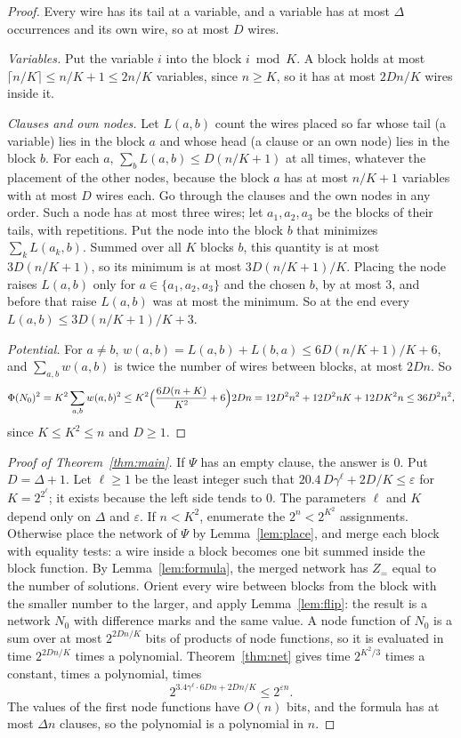 \documentclass[11pt]{article}
\begin{document}
\begin{proof}
Every wire has its tail at a variable, and a variable has at most $\Delta$ occurrences and its own wire, so at most $D$ wires.

\emph{Variables.} Put the variable $i$ into the block $i\bmod K$. A block holds at most $\lceil n/K\rceil\le n/K+1\le2n/K$ variables, since $n\ge K$, so it has at most $2Dn/K$ wires inside it.

\emph{Clauses and own nodes.} Let $L(a,b)$ count the wires placed so far whose tail (a variable) lies in the block $a$ and whose head (a clause or an own node) lies in the block $b$. For each $a$, $\sum_bL(a,b)\le D(n/K+1)$ at all times, whatever the placement of the other nodes, because the block $a$ has at most $n/K+1$ variables with at most $D$ wires each. Go through the clauses and the own nodes in any order. Such a node has at most three wires; let $a_1,a_2,a_3$ be the blocks of their tails, with repetitions. Put the node into the block $b$ that minimizes $\sum_kL(a_k,b)$. Summed over all $K$ blocks $b$, this quantity is at most $3D(n/K+1)$, so its minimum is at most $3D(n/K+1)/K$. Placing the node raises $L(a,b)$ only for $a\in\{a_1,a_2,a_3\}$ and the chosen $b$, by at most $3$, and before that raise $L(a,b)$ was at most the minimum. So at the end every $L(a,b)\le3D(n/K+1)/K+3$.

\emph{Potential.} For $a\ne b$, $w(a,b)=L(a,b)+L(b,a)\le6D(n/K+1)/K+6$, and $\sum_{a,b}w(a,b)$ is twice the number of wires between blocks, at most $2Dn$. So
\[
\Phi(N_0)^2=K^2\sum_{a,b}w(a,b)^2\le K^2\Bigl(\frac{6D(n+K)}{K^2}+6\Bigr)2Dn=12D^2n^2+12D^2nK+12DK^2n\le36D^2n^2,
\]
since $K\le K^2\le n$ and $D\ge1$.
\end{proof}

\begin{proof}[Proof of Theorem~\ref{thm:main}]
If $\Psi$ has an empty clause, the answer is $0$. Put $D=\Delta+1$. Let $\ell\ge1$ be the least integer such that $20.4\,D\gamma^\ell+2D/K\le\varepsilon$ for $K=2^{2^\ell}$; it exists because the left side tends to $0$. The parameters $\ell$ and $K$ depend only on $\Delta$ and $\varepsilon$. If $n<K^2$, enumerate the $2^n<2^{K^2}$ assignments. Otherwise place the network of $\Psi$ by Lemma~\ref{lem:place}, and merge each block with equality tests: a wire inside a block becomes one bit summed inside the block function. By Lemma~\ref{lem:formula}, the merged network has $Z_=$ equal to the number of solutions. Orient every wire between blocks from the block with the smaller number to the larger, and apply Lemma~\ref{lem:flip}: the result is a network $N_0$ with difference marks and the same value. A node function of $N_0$ is a sum over at most $2^{2Dn/K}$ bits of products of node functions, so it is evaluated in time $2^{2Dn/K}$ times a polynomial. Theorem~\ref{thm:net} gives time $2^{K^2/3}$ times a constant, times a polynomial, times
\[
2^{3.4\gamma^\ell\cdot6Dn+2Dn/K}\le2^{\varepsilon n}.
\]
The values of the first node functions have $O(n)$ bits, and the formula has at most $\Delta n$ clauses, so the polynomial is a polynomial in $n$.
\end{proof}
\end{document}
